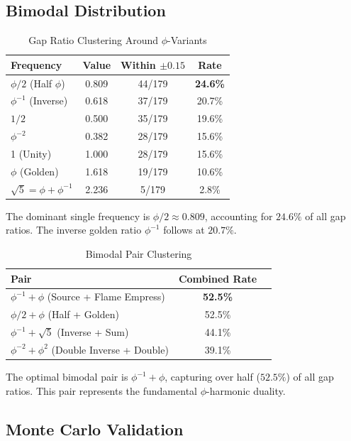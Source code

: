 \documentclass[11pt,a4paper]{article}
\begin{document}
\subsection{Bimodal Distribution}

\begin{table}[H]
\centering
\caption{Gap Ratio Clustering Around $\phi$-Variants}
\label{tab:clustering}
\begin{tabular}{@{}lccc@{}}
\toprule
\textbf{Frequency} & \textbf{Value} & \textbf{Within $\pm 0.15$} & \textbf{Rate} \\
\midrule
$\phi/2$ (Half $\phi$) & 0.809 & 44/179 & \textbf{24.6\%} \\
$\phi^{-1}$ (Inverse) & 0.618 & 37/179 & 20.7\% \\
$1/2$ & 0.500 & 35/179 & 19.6\% \\
$\phi^{-2}$ & 0.382 & 28/179 & 15.6\% \\
1 (Unity) & 1.000 & 28/179 & 15.6\% \\
$\phi$ (Golden) & 1.618 & 19/179 & 10.6\% \\
$\sqrt{5} = \phi+\phi^{-1}$ & 2.236 & 5/179 & 2.8\% \\
\bottomrule
\end{tabular}
\end{table}

The dominant single frequency is $\phi/2 \approx 0.809$, accounting for $24.6\%$ of all gap ratios. The inverse golden ratio $\phi^{-1}$ follows at $20.7\%$.

\begin{table}[H]
\centering
\caption{Bimodal Pair Clustering}
\label{tab:bimodal}
\begin{tabular}{@{}lcc@{}}
\toprule
\textbf{Pair} & \textbf{Combined Rate} \\
\midrule
$\phi^{-1} + \phi$ (Source + Flame Empress) & \textbf{52.5\%} \\
$\phi/2 + \phi$ (Half + Golden) & 52.5\% \\
$\phi^{-1} + \sqrt{5}$ (Inverse + Sum) & 44.1\% \\
$\phi^{-2} + \phi^2$ (Double Inverse + Double) & 39.1\% \\
\bottomrule
\end{tabular}
\end{table}

The optimal bimodal pair is $\phi^{-1} + \phi$, capturing over half ($52.5\%$) of all gap ratios. This pair represents the fundamental $\phi$-harmonic duality.

\subsection{Monte Carlo Validation}
\end{document}
